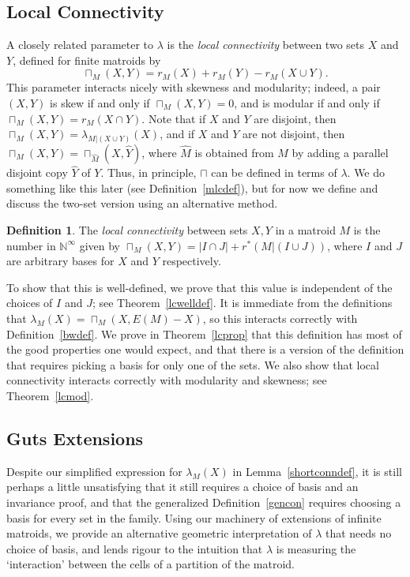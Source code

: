 \documentclass{amsart}
\theoremstyle{plain}
\newcounter{defn}
\theoremstyle{definition}
\newtheorem{definition}[defn]{Definition}
\newcommand{\enn}{\mathbb{N}^{\infty}}
\begin{document}
\subsection*{Local Connectivity}

A closely related parameter to $\lambda$ is the \emph{local connectivity} between two sets $X$ and $Y$,
defined for finite matroids by 
\[\sqcap_M(X,Y) = r_M(X) + r_M(Y) - r_M(X \cup Y).\] 
This parameter interacts nicely with skewness and modularity; 
indeed, a pair $(X,Y)$ is skew if and only if $\sqcap_M(X,Y) = 0$, 
and is modular if and only if $\sqcap_M(X,Y) = r_M(X \cap Y)$. 
Note that if $X$ and $Y$ are disjoint, then $\sqcap_M(X,Y) = \lambda_{M | (X \cup Y)}(X)$, 
and if $X$ and $Y$ are not disjoint, then $\sqcap_M(X,Y) = \sqcap_{\hat{M}}(X,\hat{Y})$, 
where $\hat{M}$ is obtained from $M$ by adding a parallel disjoint copy $\hat{Y}$ of $Y$. 
Thus, in principle, $\sqcap$ can be defined in terms of $\lambda$. 
We do something like this later (see Definition~\ref{mlcdef}), 
but for now we define and discuss the two-set version using an alternative method. 

\begin{definition}\label{lcdef}
  The \emph{local connectivity} between sets $X,Y$ in a matroid $M$ is the number in $\enn$ given by 
  $\sqcap_M(X,Y) = |I \cap J| + r^* (M | (I \cup J))$, 
  where $I$ and $J$ are arbitrary bases for $X$ and $Y$ respectively.
\end{definition}

To show that this is well-defined, 
we prove that this value is independent of the choices of $I$ and $J$; 
see Theorem~\ref{lcwelldef}.
It is immediate from the definitions that $\lambda_M(X) = \sqcap_M(X, E(M) - X)$, 
so this interacts correctly with Definition~\ref{bwdef}. We prove in Theorem~\ref{lcprop}
that this definition has most of the good properties one would expect, and 
that there is a version of the definition that requires picking a basis for only one of the 
sets. We also show that local connectivity interacts correctly with modularity and skewness;
see Theorem~\ref{lcmod}. 

\subsection*{Guts Extensions}

Despite our simplified expression for $\lambda_M(X)$ in Lemma~\ref{shortconndef}, 
it is still perhaps a little unsatisfying 
that it still requires a choice of basis and an invariance proof, and that the generalized 
Definition~\ref{gencon} requires choosing a basis for every set in the family. 
Using our machinery of extensions of infinite matroids, 
we provide an alternative geometric interpretation of $\lambda$ that needs no choice of basis, 
and lends rigour to the intuition that $\lambda$ is measuring the `interaction' between the cells 
of a partition of the matroid. 
\end{document}
